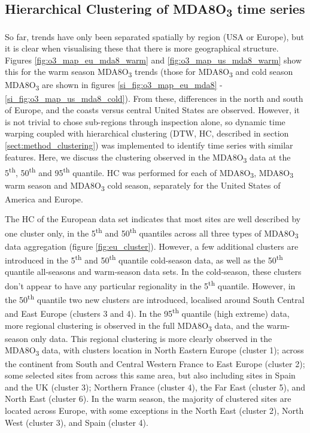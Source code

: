 \documentclass[journal abbreviation, manuscript]{copernicus}
\begin{document}

\subsection{Hierarchical Clustering of MDA8O\textsubscript{3} time series} \label{sect:clustering}

So far, trends have only been separated spatially by region (USA or Europe), but it is clear when visualising these that there is more geographical structure. Figures \ref{fig:o3_map_eu_mda8_warm} and \ref{fig:o3_map_us_mda8_warm} show this for the warm season MDA8O\textsubscript{3} trends (those for MDA8O\textsubscript{3} and cold season MDA8O\textsubscript{3} are shown in figures \ref{si_fig:o3_map_eu_mda8} - \ref{si_fig:o3_map_us_mda8_cold}). From these, differences in the north and south of Europe, and the coasts versus central United States are observed. However, it is not trivial to chose sub-regions through inspection alone, so dynamic time warping coupled with hierarchical clustering (DTW, HC, described in section \ref{sect:method_clustering}) was implemented to identify time series with similar features. Here, we discuss the clustering observed in the MDA8O\textsubscript{3} data at the 5\textsuperscript{th}, 50\textsuperscript{th} and 95\textsuperscript{th} quantile. HC was performed for each of MDA8O\textsubscript{3}, MDA8O\textsubscript{3} warm season and MDA8O\textsubscript{3} cold season, separately for the United States of America and Europe. 

The HC of the European data set indicates that most sites are well described by one cluster only, in the 5\textsuperscript{th} and 50\textsuperscript{th} quantiles across all three types of MDA8O\textsubscript{3} data aggregation (figure \ref{fig:eu_cluster}). However, a few additional clusters are introduced in the 5\textsuperscript{th} and 50\textsuperscript{th} quantile cold-season data, as well as the 50\textsuperscript{th} quantile all-seasons and warm-season data sets. In the cold-season, these clusters don't appear to have any particular regionality in the 5\textsuperscript{th} quantile. However, in the 50\textsuperscript{th} quantile two new clusters are introduced, localised around South Central and East Europe (clusters 3 and 4). In the 95\textsuperscript{th} quantile (high extreme) data, more regional clustering is observed in the full MDA8O\textsubscript{3} data, and the warm-season only data. This regional clustering is more clearly observed in the MDA8O\textsubscript{3} data, with clusters location in North Eastern Europe (cluster 1); across the continent from South and Central Western France to East Europe (cluster 2); some selected sites from across this same area, but also including sites in Spain and the UK (cluster 3); Northern France (cluster 4), the Far East (cluster 5), and North East (cluster 6). In the warm season, the majority of clustered sites are located across Europe, with some exceptions in the North East (cluster 2), North West (cluster 3), and Spain (cluster 4).
\end{document}
